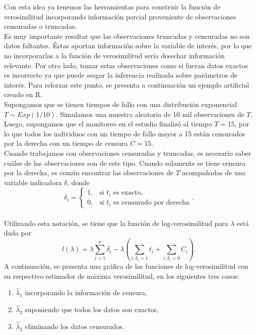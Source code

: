 \documentclass[11pt,a4paper]{article}
\begin{document}
Con esta idea ya tenemos las herramientas para construir la función de verosimilitud incorporando información parcial proveniente de observaciones censuradas o truncadas.\\

Es muy importante resaltar que las observaciones truncadas y censuradas no son datos faltantes. Éstas aportan información sobre la variable de interés, por lo que no incorporarlas a la función de verosimilitud sería desechar información relevante. Por otro lado, tomar estas observaciones como si fueran datos exactos es incorrecto ya que puede sesgar la inferencia realizada sobre parámetros de interés. Para reforzar este punto, se presenta a continuación un ejemplo artificial creado en R.\\

Supongamos que se tienen tiempos de fallo con una distribución exponencial $T \sim Exp(1/10)$. Simulamos una muestra aleatoria de 10 mil observaciones de $T$. Luego, supongamos que el monitoreo en el estudio finalizó al tiempo $T = 15$, por lo que todos los individuos con un tiempo de fallo mayor a 15 están censurados por la derecha con un tiempo de censura $C = 15$.\\

Cuando trabajamos con observaciones censuradas y truncadas, es necesario saber cuáles de las observaciones son de este tipo. Cuando solamente se tiene censura por la derecha, es común encontrar las observaciones de $T$ acompañadas de una variable indicadora $\delta$, donde $$\delta_i = \begin{cases}
1, & \text{si } t_i \text{ es exacto},\\
0, & \text{si } t_i \text{ es censurado por derecha}
\end{cases}.$$\\

Utilizando esta notación, se tiene que la función de log-verosimilitud para $\lambda$ está dada por $$l(\lambda) = \lambda \sum_{i = 1}^n \delta_i - \lambda \left(\sum_{i: \delta_i = 1} t_i + \sum_{i: \delta_i = 0} C_i\right).$$ A continuación, se presenta una gráfica de las funciones de log-verosimilitud con su respectivo estimador de máxima verosimilitud, en los siguientes tres casos:
\begin{enumerate}
\item $\hat{\lambda}_1$ incorporando la información de censura,
\item $\hat{\lambda}_2$ suponiendo que todos los datos son exactos,
\item $\hat{\lambda}_3$ eliminando los datos censurados.\\
\end{enumerate}
\end{document}
